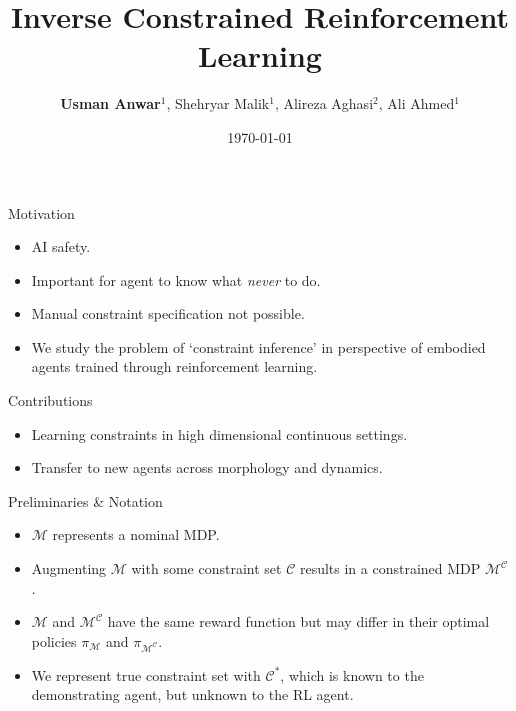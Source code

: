 \documentclass[t, pdf, aspectratio=169]{beamer}
\title{Inverse Constrained Reinforcement Learning}
\author{\textbf{Usman Anwar}$^1$, Shehryar Malik$^1$, Alireza Aghasi$^2$, Ali Ahmed$^1$}
\institute{$^1$Information Technology University, Lahore.\\$^2$Georgia State University, USA.}
\date{\today}
\begin{document}
\begin{frame}{}
    \maketitle
\end{frame}

\begin{frame}{Motivation}
\renewcommand{\baselinestretch}{1.5}
    \begin{itemize}
        \item AI safety.
        \item Important for agent to know what \textit{never} to do.
        \item Manual constraint specification not possible.
        \item We study the problem of `constraint inference' in perspective of embodied agents trained through reinforcement learning.
    \end{itemize}
    \vspace{2mm}
    \pause
    \textcolor{beamer@blendedblue}{\Large{Contributions}}
    \begin{itemize}
        \item Learning constraints in high dimensional continuous settings.
        \item Transfer to new agents across morphology and dynamics.
    \end{itemize}
\end{frame}

\begin{frame}{Preliminaries \& Notation}
\begin{itemize}
    \item $\mathcal{M}$ represents a nominal MDP.
    \vspace{5mm}
    \item Augmenting $\mathcal{M}$ with some constraint set $\mathcal{C}$ results in a constrained MDP $\mathcal{M}^\mathcal{C}$.
    \vspace{5mm}
    \item $\mathcal{M}$ and $\mathcal{M}^\mathcal{C}$ have the same reward function but may differ in their optimal policies $\pi_{\mathcal{M}}$ and $\pi_{\mathcal{M^\mathcal{C}}}$.
    \vspace{5mm}
    \item We represent true constraint set with $\mathcal{C}^*$, which is known to the demonstrating agent, but unknown to the RL agent.
\end{itemize}
\end{frame}
\end{document}
